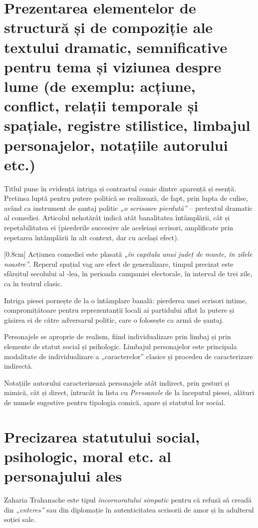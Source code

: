 \section{Prezentarea elementelor de structură și de compoziție ale textului dramatic, semnificative pentru tema și viziunea despre lume {\footnotesize\normalfont(de exemplu: acțiune, conflict, relații temporale și spațiale, registre stilistice, limbajul personajelor, notațiile autorului etc.)}}

Titlul pune în evidență intriga și contrastul comic dintre aparență și esență. Pretinsa luptă pentru putere politică se realizează, de fapt, prin lupta de culise, având ca instrument de șantaj politic \textit{„o scrisoare pierdută”} -- pretextul dramatic al comediei. Articolul nehotărât indică atât banalitatea întâmplării, cât și repetabilitatea ei (pierderile succesive ale aceleiași scrisori, amplificate prin repetarea întâmplării în alt context, dar cu același efect).

[0.8cm]
Acțiunea comediei este plasată \textit{„în capitala unui județ de munte, în zilele noastre”}. Reperul spațial vag are efect de generalizare, timpul precizat este sfârșitul secolului al -lea, în perioada campaniei electorale, în interval de trei zile, ca în teatrul clasic.

Intriga piesei pornește de la o întâmplare banală: pierderea unei scrisori intime, compromițătoare pentru reprezentanții locali ai partidului aflat la putere și găsirea ei de către adversarul politic, care o folosește ca armă de șantaj.


Personajele se aproprie de realism, fiind individualizare prin limbaj și prin elemente de statut social și psihologic. Limbajul personajelor este principala modalitate de individualizare a „caracterelor” clasice și procedeu de caracterizare indirectă.

Notațiile autorului caracterizează personajele atât indirect, prin gesturi și mimică, cât și direct, întrucât în lista cu \textit{Persoanele} de la începutul piesei, alături de numele sugestive pentru tipologia comică, apare și statutul lor social.

\section{Precizarea statutului social, psihologic, moral etc. al personajului ales}

Zaharia Trahanache este tipul \textit{încornoratului simpatic} pentru că refuză să creadă din \textit{„enteres”} sau din diplomație în autenticitatea scrisorii de amor și în adulterul soției sale.

